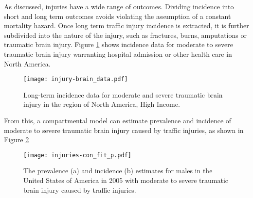 As discussed, injuries have a wide range of outcomes.  Dividing incidence into short and long term outcomes avoids violating the assumption of a constant mortality hazard.  Once long term traffic injury incidence is extracted, it is further subdivided into the nature of the injury, such as fractures, burns, amputations or traumatic brain injury.  Figure \ref{fig:app-injury brain data} shows incidence data for moderate to severe traumatic brain injury warranting hospital admission or other health care in North America.

    \begin{figure}[h]
        \begin{center}
            \texttt{[image: injury-brain\_data.pdf]}
            \caption{Long-term incidence data for moderate and severe traumatic brain injury in the region of North America, High Income.}
            \label{fig:app-injury brain data}
        \end{center}
    \end{figure}

From this, a compartmental model can estimate prevalence and incidence of moderate to severe traumatic brain injury caused by traffic injuries, as shown in Figure \ref{fig:app-injury brain fit}

    \begin{figure}[h]
        \begin{center}
            \texttt{[image: injuries-con\_fit\_p.pdf]}
            \caption{The prevalence (a) and incidence (b) estimates for males in the United States of America in 2005 with moderate to severe traumatic brain injury caused by traffic injuries.}
            \label{fig:app-injury brain fit}
        \end{center}
    \end{figure}



